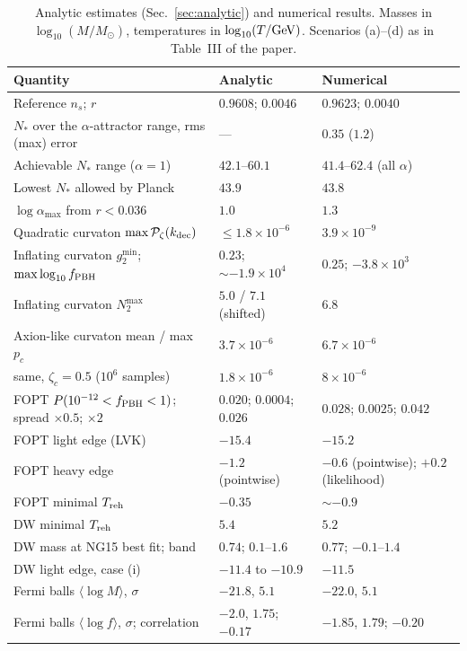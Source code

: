 \documentclass[aps,prd,onecolumn,superscriptaddress,nofootinbib,floatfix]{revtex4-2}
\newcommand{\fpbh}{f_{\rm PBH}}
\newcommand{\Msun}{M_\odot}
\newcommand{\Treh}{T_{\rm reh}}
\newcommand{\Ns}{N_\ast}
\begin{document}
\begin{table}[htbp]
\caption{Analytic estimates (Sec.~\ref{sec:analytic}) and numerical results. Masses in $\log_{10}(M/\Msun)$, temperatures in $\log_{10}(T/{\rm GeV})$. Scenarios (a)--(d) as in Table~III of the paper.}
\label{tab:analytic}
\small
\begin{ruledtabular}
\begin{tabular}{lll}
Quantity & Analytic & Numerical \\
\hline
Reference $n_s$; $r$ & $0.9608$; $0.0046$ & $0.9623$; $0.0040$ \\
$\Ns$ over the $\alpha$-attractor range, rms (max) error & --- & $0.35$ ($1.2$) \\
Achievable $\Ns$ range ($\alpha=1$) & $42.1$--$60.1$ & $41.4$--$62.4$ (all $\alpha$) \\
Lowest $\Ns$ allowed by Planck & $43.9$ & $43.8$ \\
$\log\alpha_{\max}$ from $r<0.036$ & $1.0$ & $1.3$ \\
Quadratic curvaton $\max\mathcal{P}_\zeta(k_{\rm dec})$ & $\le1.8\times10^{-6}$ & $3.9\times10^{-9}$ \\
Inflating curvaton $g_2^{\min}$; $\max\log_{10}\fpbh$ & $0.23$; $\sim-1.9\times10^{4}$ & $0.25$; $-3.8\times10^{3}$ \\
Inflating curvaton $N_2^{\max}$ & $5.0$ / $7.1$ (shifted) & $6.8$ \\
Axion-like curvaton mean / max $p_c$ & $3.7\times10^{-6}$ & $6.7\times10^{-6}$ \\
\quad same, $\zeta_c=0.5$ ($10^6$ samples) & $1.8\times10^{-6}$ & $8\times10^{-6}$ \\
FOPT $P(10^{-12}<\fpbh<1)$; spread $\times0.5$; $\times2$ & $0.020$; $0.0004$; $0.026$ & $0.028$; $0.0025$; $0.042$ \\
FOPT light edge (LVK) & $-15.4$ & $-15.2$ \\
FOPT heavy edge & $-1.2$ (pointwise) & $-0.6$ (pointwise); $+0.2$ (likelihood) \\
FOPT minimal $\Treh$ & $-0.35$ & $\sim-0.9$ \\
DW minimal $\Treh$ & $5.4$ & $5.2$ \\
DW mass at NG15 best fit; band & $0.74$; $0.1$--$1.6$ & $0.77$; $-0.1$--$1.4$ \\
DW light edge, case (i) & $-11.4$ to $-10.9$ & $-11.5$ \\
Fermi balls $\langle\log M\rangle$, $\sigma$ & $-21.8$, $5.1$ & $-22.0$, $5.1$ \\
Fermi balls $\langle\log f\rangle$, $\sigma$; correlation & $-2.0$, $1.75$; $-0.17$ & $-1.85$, $1.79$; $-0.20$ \\

\end{tabular}
\end{ruledtabular}
\end{table}
\end{document}
